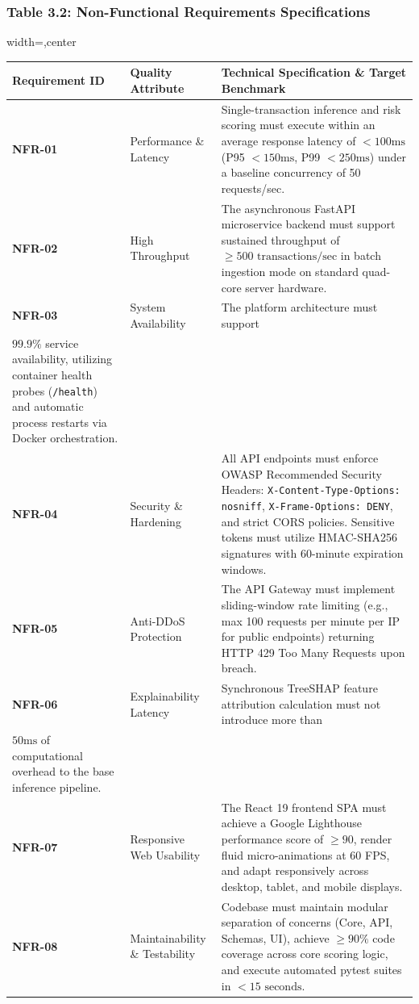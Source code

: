 \documentclass[12pt,a4paper,oneside]{report}
\begin{document}
\subsubsection{Table 3.2: Non-Functional Requirements Specifications}

\begin{table}[H]
\centering
\footnotesize
\begin{adjustbox}{width=\textwidth,center}
\begin{tabular}{| l | l | l |}
\hline
\rowcolor{tableheader} \textbf{Requirement ID} & \textbf{Quality Attribute} & \textbf{Technical Specification \& Target Benchmark} \\ \hline
\textbf{NFR-01} & Performance \& Latency & Single-transaction inference and risk scoring must execute within an average response latency of $< 100\text{ms}$ (P95 $< 150\text{ms}$, P99 $< 250\text{ms}$) under a baseline concurrency of 50 requests/sec. \\ \hline
\rowcolor{tablealt} \textbf{NFR-02} & High Throughput & The asynchronous FastAPI microservice backend must support sustained throughput of $\ge 500\text{ transactions/sec}$ in batch ingestion mode on standard quad-core server hardware. \\ \hline
\textbf{NFR-03} & System Availability & The platform architecture must support \\$99.9\%$ service availability, utilizing container health probes (\texttt{/health}) and automatic process restarts via Docker orchestration. \\ \hline
\rowcolor{tablealt} \textbf{NFR-04} & Security \& Hardening & All API endpoints must enforce OWASP Recommended Security Headers: \texttt{X-Content-Type-Options: nosniff}, \texttt{X-Frame-Options: DENY}, and strict CORS policies. Sensitive tokens must utilize HMAC-SHA256 signatures with 60-minute expiration windows. \\ \hline
\textbf{NFR-05} & Anti-DDoS Protection & The API Gateway must implement sliding-window rate limiting (e.g., max 100 requests per minute per IP for public endpoints) returning HTTP 429 Too Many Requests upon breach. \\ \hline
\rowcolor{tablealt} \textbf{NFR-06} & Explainability Latency & Synchronous TreeSHAP feature attribution calculation must not introduce more than \\$50\text{ms}$ of computational overhead to the base inference pipeline. \\ \hline
\textbf{NFR-07} & Responsive Web Usability & The React 19 frontend SPA must achieve a Google Lighthouse performance score of $\ge 90$, render fluid micro-animations at 60 FPS, and adapt responsively across desktop, tablet, and mobile displays. \\ \hline
\rowcolor{tablealt} \textbf{NFR-08} & Maintainability \& Testability & Codebase must maintain modular separation of concerns (Core, API, Schemas, UI), achieve $\ge 90\%$ code coverage across core scoring logic, and execute automated pytest suites in $< 15\text{ seconds}$. \\ \hline
\end{tabular}
\end{adjustbox}
\end{table}
\end{document}
